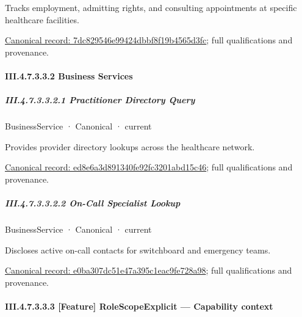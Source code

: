 Tracks employment, admitting rights, and consulting appointments at specific healthcare facilities.


{\footnotesize \href{../../../../continuum/business/business-function/7dc829546e99424dbbf8f19b4565d3fc.md}{Canonical record: 7dc829546e99424dbbf8f19b4565d3fc}; full qualifications and provenance.}\par
\paragraph*{III.4.7.3.3.2 Business Services}
\label{navigation:III.4.7.3.3.2}

\subparagraph*{III.4.7.3.3.2.1 Practitioner Directory Query}
\label{navigation:III.4.7.3.3.2.1}

\label{element:ed8e6a3d891340fe92fc3201abd15c46}
{\small BusinessService · Canonical · current}\par

Provides provider directory lookups across the healthcare network.


{\footnotesize \href{../../../../continuum/business/business-service/ed8e6a3d891340fe92fc3201abd15c46.md}{Canonical record: ed8e6a3d891340fe92fc3201abd15c46}; full qualifications and provenance.}\par
\subparagraph*{III.4.7.3.3.2.2 On-Call Specialist Lookup}
\label{navigation:III.4.7.3.3.2.2}

\label{element:e0ba307dc51e47a395c1eac9fe728a98}
{\small BusinessService · Canonical · current}\par

Discloses active on-call contacts for switchboard and emergency teams.


{\footnotesize \href{../../../../continuum/business/business-service/e0ba307dc51e47a395c1eac9fe728a98.md}{Canonical record: e0ba307dc51e47a395c1eac9fe728a98}; full qualifications and provenance.}\par
\paragraph*{III.4.7.3.3.3 [Feature] RoleScopeExplicit — Capability context}
\label{navigation:III.4.7.3.3.3}

